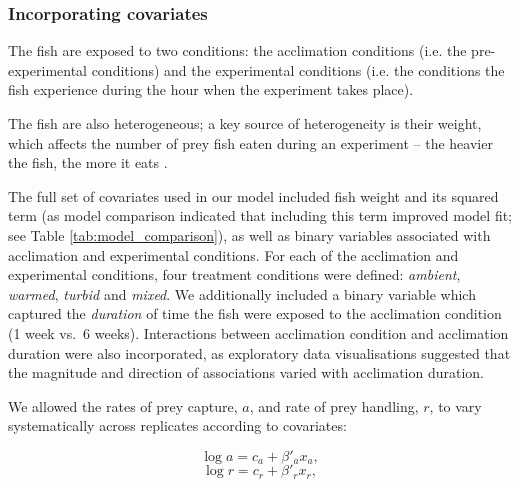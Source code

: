 \documentclass[ASNA,twocolumn]{USG} %
\begin{document}
\subsubsection{Incorporating covariates}

The fish are exposed to two conditions: the acclimation conditions (i.e. the pre-experimental conditions) and the experimental conditions (i.e. the conditions the fish experience during the hour when the experiment takes place). 

The fish are also heterogeneous; a key source of heterogeneity is their weight, which affects the number of prey fish eaten during an experiment – the heavier the fish, the more it eats \citep{beukemaPredationThreeSpinedStickleback1968}. 

The full set of covariates used in our model included fish weight and its squared term (as model comparison indicated that including this term improved model fit; see Table \ref{tab:model_comparison}), as well as binary variables associated with acclimation and experimental conditions. For each of the acclimation and experimental conditions, four treatment conditions were defined: \textit{ambient}, \textit{warmed}, \textit{turbid} and \textit{mixed}. We additionally included a binary variable which captured the \textit{duration} of time the fish were exposed to the acclimation condition (1 week vs.\ 6 weeks). Interactions between acclimation condition and acclimation duration were also incorporated, as exploratory data visualisations suggested that the magnitude and direction of associations varied with acclimation duration. 

We allowed the rates of prey capture, \begin{math}a\end{math}, and rate of prey handling, \begin{math}r\end{math}, to vary systematically across replicates according to covariates:

\begin{equation}
\label{eqn:eqn3}
\log a = c_a + \beta'_a x_a,
\end{equation}
\begin{equation}
\label{eqn:eqn4}
\log r = c_r + \beta'_r x_r,
\end{equation}
\end{document}
